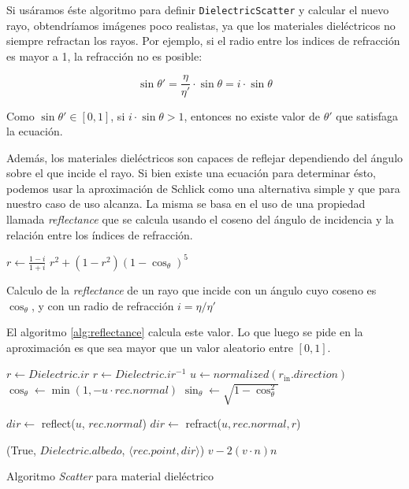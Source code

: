 Si usáramos éste algoritmo para definir \texttt{DielectricScatter} y calcular el
nuevo rayo, obtendríamos imágenes poco realistas, ya que los materiales
dieléctricos no siempre refractan los rayos. Por ejemplo, si el radio entre los
indices de refracción es mayor a 1, la refracción no es posible:

\[
    \sin \theta' = \frac{\eta}{\eta'} \cdot \sin \theta = i \cdot \sin \theta
\]

Como $\sin \theta' \in [0, 1]$, si $i \cdot \sin \theta > 1$, entonces no existe valor
de $\theta'$ que satisfaga la ecuación.

Además, los materiales dieléctricos son capaces de reflejar dependiendo del
ángulo sobre el que incide el rayo. Si bien existe una ecuación para determinar
ésto, podemos usar la aproximación de Schlick \cite{schlicksapprox} como una
alternativa simple y que para nuestro caso de uso alcanza. La misma se basa en
el uso de una propiedad llamada \textit{reflectance} que se calcula usando el
coseno del ángulo de incidencia y la relación entre los índices de refracción.

\begin{algorithm}[H]
\begin{algorithmic}[1]
    \State $r \gets \frac{1 - i}{1 + i}$
    \State \Return $r^2 + (1-r^2) (1 - \cos_{\theta})^5$
\EndFunction
\end{algorithmic}
\caption{Calculo de la \textit{reflectance} de un rayo que incide con un ángulo
cuyo coseno es $\cos_{\theta}$, y con un radio de refracción $i = \eta / \eta'$}
\label{alg:reflectance}
\end{algorithm}

El algoritmo \ref{alg:reflectance} calcula este valor. Lo que luego se pide en
la aproximación es que sea mayor que un valor aleatorio entre $[0, 1]$.

\begin{algorithm}[H]
\begin{algorithmic}[1]
    \State $r \gets Dielectric.ir$
        \State $r \gets Dielectric.ir^{-1}$
    \EndIf
    \State $u \gets normalized(r_{\text{in}}.direction)$
    \State $\cos_{\theta} \gets \min(1, -u \cdot rec.normal)$
    \State $\sin_{\theta} \gets \sqrt{1 - \cos_{\theta}^2}$

        \State $dir \gets$ reflect($u$, $rec.normal$)
    \Else
        \State $dir \gets$ refract($u, rec.normal, r$)
    \EndIf

    \State \Return (True, $Dielectric.albedo$, $\langle rec.point, dir \rangle$)
\EndFunction
{}
    \State \Return $v - 2 (v \cdot n) n$
\EndFunction
\end{algorithmic}
\caption{Algoritmo \textit{Scatter} para material dieléctrico}
\label{alg:dielectric-scatter}
\end{algorithm}
